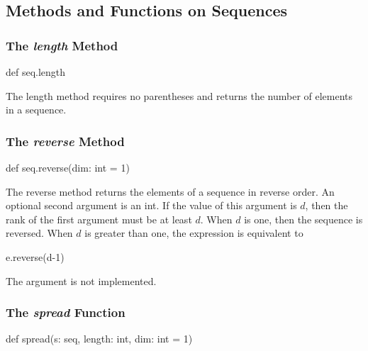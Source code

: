 \subsection{Methods and Functions on Sequences}
\label{Methods_and_Functions_on_Sequences}

\subsubsection{The {\em length} Method}
\label{The_em_length_Method}

\begin{chapel}
def seq.length
\end{chapel}

The length method requires no parentheses and returns the number of
elements in a sequence.

\subsubsection{The {\em reverse} Method}
\label{The_em_reverse_Method}

\begin{chapel}
def seq.reverse(dim: int = 1)
\end{chapel}

The reverse method returns the elements of a sequence in reverse
order.  An optional second argument is an int. If the value of this
argument is $d$, then the rank of the first argument must be at least
$d$. When $d$ is one, then the sequence is reversed. When $d$ is
greater than one, the expression  is equivalent to
\begin{chapel}
[e in s] e.reverse(d-1)
\end{chapel}

\begin{implementation}
The  argument is not implemented.
\end{implementation}

\subsubsection{The {\em spread} Function}
\label{The_em_spread_Function}

\begin{chapel}
def spread(s: seq, length: int, dim: int = 1)
\end{chapel}

